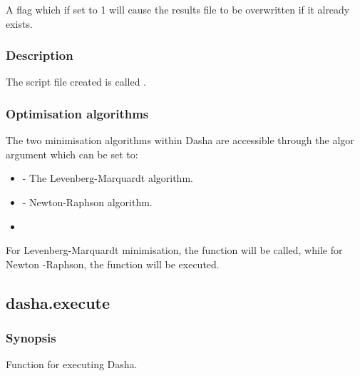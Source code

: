    A flag which if set to 1 will cause the results file to be overwritten if it already exists.  

  

  
 \subsubsection{Description} 

 The script file created is called . 
  

  
 \subsubsection{Optimisation algorithms} 

 The two minimisation algorithms within Dasha are accessible through the algor argument which can be set to: 
  

 \begin{itemize} 
 \item[]  - The Levenberg-Marquardt algorithm.  
 \item[]  - Newton-Raphson algorithm.  
 \item[]  
 \end{itemize} 
  

 For Levenberg-Marquardt minimisation, the function  will be called, while for Newton -Raphson, the function  will be executed. 
  

  

 \newpage 

 \subsection{dasha.execute} 

  
 \subsubsection{Synopsis} 

 Function for executing Dasha. 
  

